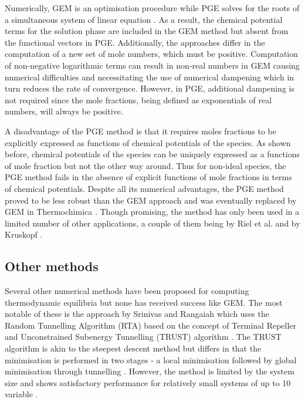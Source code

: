	Numerically, GEM is an optimisation procedure while PGE solves for the roots of a simultaneous system of linear equation \cite{vanZeggeren11}. As a result, the chemical potential terms for the solution phase are included in the GEM method but absent from the functional vectors in PGE. Additionally, the approaches differ in the computation of a new set of mole numbers, which must be positive. Computation of non-negative logarithmic terms can result in non-real numbers in GEM causing numerical difficulties and necessitating the use of numerical dampening which in turn reduces the rate of convergence. However, in PGE, additional dampening is not required since the mole fractions, being defined as exponentials of real numbers, will always be positive.

	A disadvantage of the PGE method is that it requires moles fractions to be explicitly expressed as functions of chemical potentials of the species. As shown before, chemical potentials of the species can be uniquely expressed as a functions of mole fraction but not the other way around. Thus for non-ideal species, the PGE method fails in the absence of explicit functions of mole fractions in terms of chemical potentials. Despite all its numerical advantages, the PGE method proved to be less robust than the GEM approach and was eventually replaced by GEM in Thermochimica \cite{Bajpai:2021ab}. Though promising, the method has only been used in a limited number of other applications, a couple of them being by Riel et al. \cite{Riel:2022aa} and by Kruskopf \cite{Kruskopf:2018aa}.

	\subsection{Other methods}
	Several other numerical methods have been proposed for computing thermodynamic equilibria but none has received success like GEM. The most notable of these is the approach by Srinivas and Rangaiah which uses  the Random Tunnelling Algorithm (RTA) based on the concept of Terminal Repeller and Unconstrained Subenergy Tunnelling (TRUST) algorithm \cite{Srinivas06}. The TRUST algorithm is akin to the steepest descent method but differs in that the minimisation is performed in two stages - a local minimisation followed by global minimisation through tunnelling \cite{Nocedal06}.  However, the method is limited by the system size and shows satisfactory performance for relatively small systems of up to 10 variable \cite{Nocedal06}.

